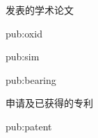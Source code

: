 \begin{publication}
  \begin{pubgroup}{发表的学术论文}
    \item{pub:oxid}
    \item{pub:sim}
    \item{pub:bearing}
  \end{pubgroup}
  \begin{pubgroup}{申请及已获得的专利}
    \item{pub:patent}
  \end{pubgroup}
\end{publication}
